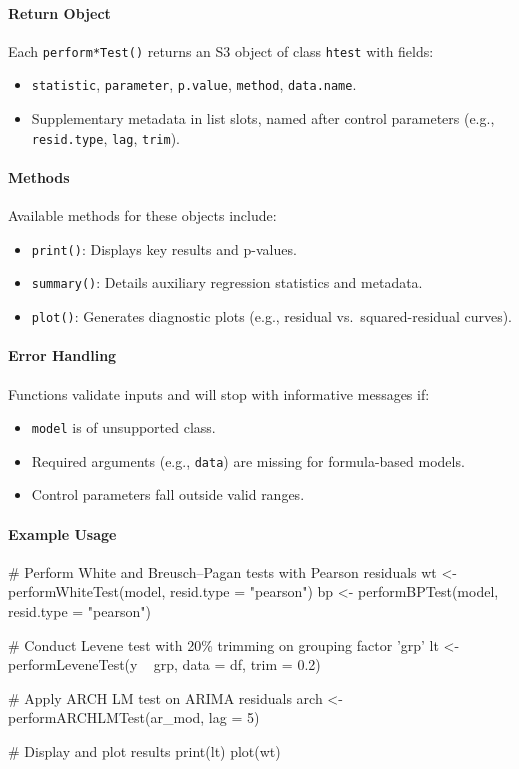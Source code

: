 \paragraph{Return Object}
Each \texttt{perform*Test()} returns an S3 object of class \texttt{htest} with fields:
\begin{itemize}
  \item \texttt{statistic}, \texttt{parameter}, \texttt{p.value}, \texttt{method}, \texttt{data.name}.
  \item Supplementary metadata in list slots, named after control parameters (e.g., \texttt{resid.type}, \texttt{lag}, \texttt{trim}).
\end{itemize}

\paragraph{Methods}
Available methods for these objects include:
\begin{itemize}
  \item \texttt{print()}: Displays key results and p-values.
  \item \texttt{summary()}: Details auxiliary regression statistics and metadata.
  \item \texttt{plot()}: Generates diagnostic plots (e.g., residual vs.\ squared-residual curves).
\end{itemize}

\paragraph{Error Handling}
Functions validate inputs and will stop with informative messages if:
\begin{itemize}
  \item \texttt{model} is of unsupported class.
  \item Required arguments (e.g., \texttt{data}) are missing for formula-based models.
  \item Control parameters fall outside valid ranges.
\end{itemize}

\paragraph{Example Usage}
\begin{example}
# Perform White and Breusch–Pagan tests with Pearson residuals
wt <- performWhiteTest(model, resid.type = "pearson")
bp <- performBPTest(model, resid.type = "pearson")

# Conduct Levene test with 20\% trimming on grouping factor 'grp'
lt <- performLeveneTest(y ~ grp, data = df, trim = 0.2)

# Apply ARCH LM test on ARIMA residuals
arch <- performARCHLMTest(ar_mod, lag = 5)

# Display and plot results
print(lt)
plot(wt)
\end{example}



